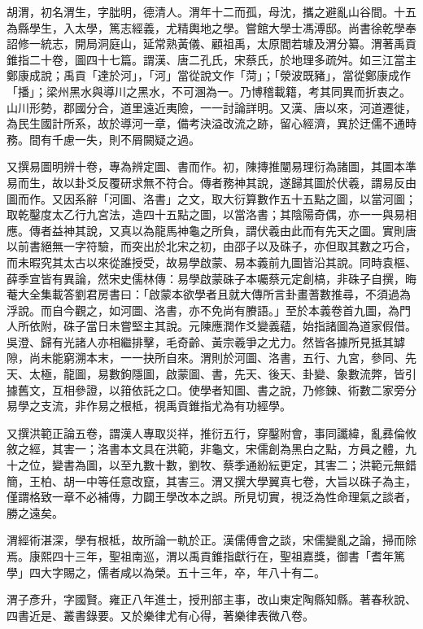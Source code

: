\begin{pinyinscope}
胡渭，初名渭生，字朏明，德清人。渭年十二而孤，母沈，攜之避亂山谷間。十五為縣學生，入太學，篤志經義，尤精輿地之學。嘗館大學士馮溥邸。尚書徐乾學奉詔修一統志，開局洞庭山，延常熟黃儀、顧祖禹，太原閻若璩及渭分纂。渭著禹貢錐指二十卷，圖四十七篇。謂漢、唐二孔氏，宋蔡氏，於地理多疏舛。如三江當主鄭康成說；禹貢「達於河」，「河」當從說文作「菏」；「滎波既豬」，當從鄭康成作「播」；梁州黑水與導川之黑水，不可溷為一。乃博稽載籍，考其同異而折衷之。山川形勢，郡國分合，道里遠近夷險，一一討論詳明。又漢、唐以來，河道遷徙，為民生國計所系，故於導河一章，備考決溢改流之跡，留心經濟，異於迂儒不通時務。間有千慮一失，則不屑闕疑之過。

又撰易圖明辨十卷，專為辨定圖、書而作。初，陳摶推闡易理衍為諸圖，其圖本準易而生，故以卦爻反覆研求無不符合。傳者務神其說，遂歸其圖於伏羲，謂易反由圖而作。又因系辭「河圖、洛書」之文，取大衍算數作五十五點之圖，以當河圖；取乾鑿度太乙行九宮法，造四十五點之圖，以當洛書；其陰陽奇偶，亦一一與易相應。傳者益神其說，又真以為龍馬神龜之所負，謂伏羲由此而有先天之圖。實則唐以前書絕無一字符驗，而突出於北宋之初，由邵子以及硃子，亦但取其數之巧合，而未暇究其太古以來從誰授受，故易學啟蒙、易本義前九圖皆沿其說。同時袁樞、薛季宣皆有異論，然宋史儒林傳：易學啟蒙硃子本囑蔡元定創槁，非硃子自撰，晦菴大全集載答劉君房書曰：「啟蒙本欲學者且就大傳所言卦畫蓍數推尋，不須過為浮說。而自今觀之，如河圖、洛書，亦不免尚有賸語。」至於本義卷首九圖，為門人所依附，硃子當日未嘗堅主其說。元陳應潤作爻變義蘊，始指諸圖為道家假借。吳澄、歸有光諸人亦相繼排擊，毛奇齡、黃宗羲爭之尤力。然皆各據所見抵其罅隙，尚未能窮溯本末，一一抉所自來。渭則於河圖、洛書，五行、九宮，參同、先天、太極，龍圖，易數鉤隱圖，啟蒙圖、書，先天、後天、卦變、象數流弊，皆引據舊文，互相參證，以箝依託之口。使學者知圖、書之說，乃修鍊、術數二家旁分易學之支流，非作易之根柢，視禹貢錐指尤為有功經學。

又撰洪範正論五卷，謂漢人專取災祥，推衍五行，穿鑿附會，事同讖緯，亂彞倫攸敘之經，其害一；洛書本文具在洪範，非龜文，宋儒創為黑白之點，方員之體，九十之位，變書為圖，以至九數十數，劉牧、蔡季通紛紜更定，其害二；洪範元無錯簡，王柏、胡一中等任意改竄，其害三。渭又撰大學翼真七卷，大旨以硃子為主，僅謂格致一章不必補傳，力闢王學改本之誤。所見切實，視泛為性命理氣之談者，勝之遠矣。

渭經術湛深，學有根柢，故所論一軌於正。漢儒傅會之談，宋儒變亂之論，掃而除焉。康熙四十三年，聖祖南巡，渭以禹貢錐指獻行在，聖祖嘉獎，御書「耆年篤學」四大字賜之，儒者咸以為榮。五十三年，卒，年八十有二。

渭子彥升，字國賢。雍正八年進士，授刑部主事，改山東定陶縣知縣。著春秋說、四書近是、叢書錄要。又於樂律尤有心得，著樂律表微八卷。


\end{pinyinscope}
